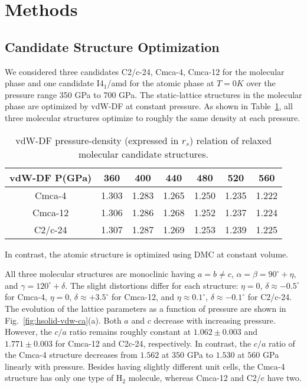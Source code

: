 \section{Methods}
\label{sec:hsolid-methods}

\subsection{Candidate Structure Optimization}
We considered three candidates C2/c-24, Cmca-4, Cmca-12 for the molecular phase and one candidate I4$_1$/amd for the atomic phase at $T=0K$ over the pressure range 350 GPa to 700 GPa. The static-lattice structures in the molecular phase are optimized by vdW-DF at constant pressure.
As shown in Table~\ref{tab:hsolid-mol-press-rs}, all three molecular structures optimize to roughly the same density at each pressure.
\begin{table}[h]
\centering
\begin{tabular}{ccccccc}
\toprule
vdW-DF P(GPa) & 360 & 400 & 440 & 480 & 520 & 560 \\
\midrule
Cmca-4  & 1.303 & 1.283 & 1.265 & 1.250 & 1.235 & 1.222 \\
Cmca-12 & 1.306 & 1.286 & 1.268 & 1.252 & 1.237 & 1.224 \\
C2/c-24 & 1.307 & 1.287 & 1.269 & 1.253 & 1.239 & 1.225 \\
\bottomrule
\end{tabular}
\caption{vdW-DF pressure-density (expressed in $r_s$) relation of relaxed molecular candidate structures.}
\label{tab:hsolid-mol-press-rs}
\end{table}
In contrast, the atomic structure is optimized using DMC at constant volume.

All three molecular structures are monoclinic having $a=b\neq c$, $\alpha=\beta=90^\circ+\eta$, and $\gamma=120^\circ+\delta$. The slight distortions differ for each structure: $\eta=0$, $\delta\approx -0.5^\circ$ for Cmca-4, $\eta=0$, $\delta\approx+3.5^\circ$ for Cmca-12, and $\eta\approx0.1^\circ$, $\delta\approx-0.1^\circ$ for C2/c-24.
The evolution of the lattice parameters as a function of pressure are shown in Fig.~\ref{fig:hsolid-vdw-ca}(a).
Both $a$ and $c$ decrease with increasing pressure.
However, the $c/a$ ratio remains roughly constant at $1.062\pm0.003$ and $1.771\pm0.003$ for Cmca-12 and C2c-24, respectively.
In contrast, the $c/a$ ratio of the Cmca-4 structure decreases from $1.562$ at $350$ GPa to $1.530$ at $560$ GPa linearly with pressure.
Besides having slightly different unit cells, the Cmca-4 structure has only one type of H$_2$ molecule, whereas Cmca-12 and C2/c have two.

